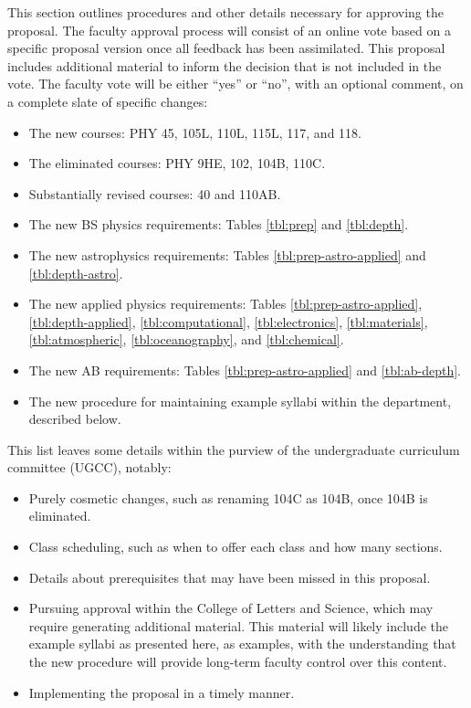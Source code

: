 \documentclass[12pt]{article}
\begin{document}
This section outlines procedures and other details necessary for
approving the proposal.  The faculty approval process will consist of
an online vote based on a specific proposal version once all feedback
has been assimilated.  This proposal includes additional material to
inform the decision that is not included in the vote.  The faculty
vote will be either ``yes'' or ``no'', with an optional comment, on a
complete slate of specific changes:
\begin{itemize}
 \item The new courses: PHY 45, 105L, 110L, 115L, 117, and 118.
 \item The eliminated courses:  PHY 9HE, 102, 104B, 110C.
 \item Substantially revised courses: 40 and 110AB.
 \item The new BS physics requirements: Tables \ref{tbl:prep} and \ref{tbl:depth}.
 \item The new astrophysics requirements: Tables \ref{tbl:prep-astro-applied} and \ref{tbl:depth-astro}.   
 \item The new applied physics requirements: Tables \ref{tbl:prep-astro-applied}, \ref{tbl:depth-applied},
\ref{tbl:computational}, \ref{tbl:electronics}, \ref{tbl:materials}, \ref{tbl:atmospheric}, \ref{tbl:oceanography}, and \ref{tbl:chemical}.   
 \item The new AB requirements: Tables \ref{tbl:prep-astro-applied} and \ref{tbl:ab-depth}.
 \item The new procedure for maintaining example syllabi within the department, described below.
\end{itemize}
This list leaves some details within the purview of the undergraduate
curriculum committee (UGCC), notably:
\begin{itemize}
 \item Purely cosmetic changes, such as renaming 104C as 104B, once 104B is eliminated.
 \item Class scheduling, such as when to offer each class and how many sections.
 \item Details about prerequisites that may have been missed in this proposal.
 \item Pursuing approval within the College of Letters and Science, which may require
   generating additional material.  This material will likely include
   the example syllabi as presented here, as examples, with the
   understanding that the new procedure will provide long-term faculty
   control over this content.
 \item Implementing the proposal in a timely manner.
\end{itemize}
\end{document}
